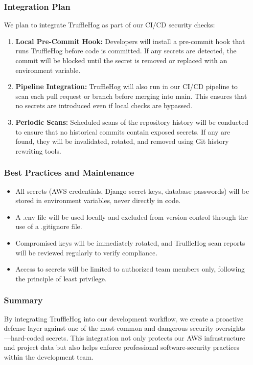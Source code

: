 \documentclass[12pt]{article}
\begin{document}
\subsubsection{Integration Plan}
We plan to integrate TruffleHog as part of our CI/CD security checks:
\begin{enumerate}
    \item \textbf{Local Pre-Commit Hook:} Developers will install a pre-commit hook that runs TruffleHog before code is committed. If any secrets are detected, the commit will be blocked until the secret is removed or replaced with an environment variable.
    \item \textbf{Pipeline Integration:} TruffleHog will also run in our CI/CD pipeline to scan each pull request or branch before merging into main. This ensures that no secrets are introduced even if local checks are bypassed.
    \item \textbf{Periodic Scans:} Scheduled scans of the repository history will be conducted to ensure that no historical commits contain exposed secrets. If any are found, they will be invalidated, rotated, and removed using Git history rewriting tools.
\end{enumerate}

\subsubsection{Best Practices and Maintenance}
\begin{itemize}
    \item All secrets (AWS credentials, Django secret keys, database passwords) will be stored in environment variables, never directly in code.
    \item A .env file will be used locally and excluded from version control through the use of a .gitignore file.
    \item Compromised keys will be immediately rotated, and TruffleHog scan reports will be reviewed regularly to verify compliance.
    \item Access to secrets will be limited to authorized team members only, following the principle of least privilege.
\end{itemize}

\subsubsection{Summary}
By integrating TruffleHog into our development workflow, we create a proactive defense layer against one of the most common and dangerous security oversights—hard-coded secrets. This integration not only protects our AWS infrastructure and project data but also helps enforce professional software-security practices within the development team.
\end{document}
